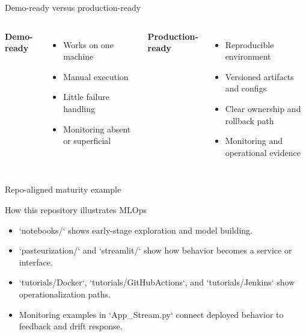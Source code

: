 \begin{frame}{Demo-ready versus production-ready}
\begin{columns}[T]
\textbf{Demo-ready}
\begin{itemize}
\item Works on one machine
\item Manual execution
\item Little failure handling
\item Monitoring absent or superficial
\end{itemize}
\textbf{Production-ready}
\begin{itemize}
\item Reproducible environment
\item Versioned artifacts and configs
\item Clear ownership and rollback path
\item Monitoring and operational evidence
\end{itemize}
\end{columns}
\coursefooter
\end{frame}

\begin{frame}{Repo-aligned maturity example}
\coursefooter
\end{frame}

\begin{frame}{How this repository illustrates MLOps}
\begin{itemize}
\item `notebooks/` shows early-stage exploration and model building.
\item `pasteurization/` and `streamlit/` show how behavior becomes a service or interface.
\item `tutorials/Docker`, `tutorials/GitHubActions`, and `tutorials/Jenkins` show operationalization paths.
\item Monitoring examples in `App_Stream.py` connect deployed behavior to feedback and drift response.
\end{itemize}
\coursefooter
\end{frame}

